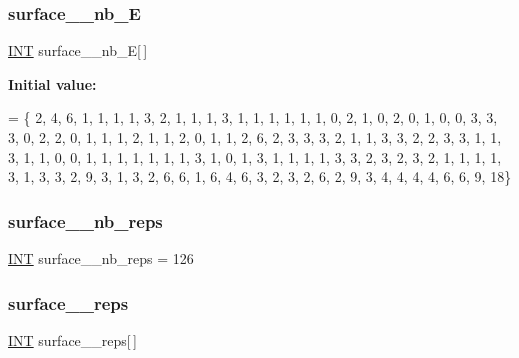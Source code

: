 \mbox{\label{surface__43_8_c_a3ece97e074bfcac69d6c71dc9bd086aa}} 
\subsubsection{\texorpdfstring{surface\+\_\+\_\+nb\+\_\+E}{surface\_43\_nb\_E}}
{\footnotesize\ttfamily \mbox{\hyperlink{galois_8h_a09fddde158a3a20bd2dcadb609de11dc}{I\+NT}} surface\+\_\+\_\+nb\+\_\+E\mbox{[}$\,$\mbox{]}}

{\bfseries Initial value\+:}
\begin{DoxyCode}
= \{ 
    2, 4, 6, 1, 1, 1, 1, 3, 2, 1, 
    1, 1, 3, 1, 1, 1, 1, 1, 1, 0, 
    2, 1, 0, 2, 0, 1, 0, 0, 3, 3, 
    3, 0, 2, 2, 0, 1, 1, 1, 2, 1, 
    1, 2, 0, 1, 1, 2, 6, 2, 3, 3, 
    3, 2, 1, 1, 3, 3, 2, 2, 3, 3, 
    1, 1, 3, 1, 1, 0, 0, 1, 1, 1, 
    1, 1, 1, 1, 3, 1, 0, 1, 3, 1, 
    1, 1, 1, 3, 3, 2, 3, 2, 3, 2, 
    1, 1, 1, 1, 3, 1, 3, 3, 2, 9, 
    3, 1, 3, 2, 6, 6, 1, 6, 4, 6, 
    3, 2, 3, 2, 6, 2, 9, 3, 4, 4, 
    4, 4, 6, 6, 9, 18\}
\end{DoxyCode}
\mbox{\label{surface__43_8_c_ab7892b26022abba64ac6272b5f8b336b}} 
\subsubsection{\texorpdfstring{surface\+\_\+\_\+nb\+\_\+reps}{surface\_43\_nb\_reps}}
{\footnotesize\ttfamily \mbox{\hyperlink{galois_8h_a09fddde158a3a20bd2dcadb609de11dc}{I\+NT}} surface\+\_\+\_\+nb\+\_\+reps = 126}

\mbox{\label{surface__43_8_c_acc8e5684244cdeef3a735847495f7c7b}} 
\subsubsection{\texorpdfstring{surface\+\_\+\_\+reps}{surface\_43\_reps}}
{\footnotesize\ttfamily \mbox{\hyperlink{galois_8h_a09fddde158a3a20bd2dcadb609de11dc}{I\+NT}} surface\+\_\+\_\+reps\mbox{[}$\,$\mbox{]}}


